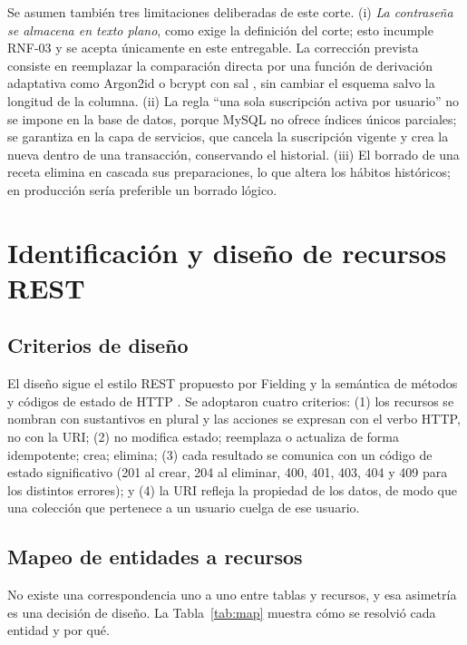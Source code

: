 Se asumen también tres limitaciones deliberadas de este corte. (i) \emph{La contraseña se almacena en texto plano}, como exige la definición del corte; esto incumple RNF-03 y se acepta únicamente en este entregable. La corrección prevista consiste en reemplazar la comparación directa por una función de derivación adaptativa como Argon2id o bcrypt con sal \cite{owasp,nist}, sin cambiar el esquema salvo la longitud de la columna. (ii) La regla ``una sola suscripción activa por usuario'' no se impone en la base de datos, porque MySQL no ofrece índices únicos parciales; se garantiza en la capa de servicios, que cancela la suscripción vigente y crea la nueva dentro de una transacción, conservando el historial. (iii) El borrado de una receta elimina en cascada sus preparaciones, lo que altera los hábitos históricos; en producción sería preferible un borrado lógico.

\section{Identificación y diseño de recursos REST}

\subsection{Criterios de diseño}
El diseño sigue el estilo REST propuesto por Fielding \cite{fielding} y la semántica de métodos y códigos de estado de HTTP \cite{rfc9110}. Se adoptaron cuatro criterios: (1) los recursos se nombran con sustantivos en plural y las acciones se expresan con el verbo HTTP, no con la URI; (2)  no modifica estado;  reemplaza o actualiza de forma idempotente;  crea;  elimina; (3) cada resultado se comunica con un código de estado significativo (201 al crear, 204 al eliminar, 400, 401, 403, 404 y 409 para los distintos errores); y (4) la URI refleja la propiedad de los datos, de modo que una colección que pertenece a un usuario cuelga de ese usuario.

\subsection{Mapeo de entidades a recursos}
No existe una correspondencia uno a uno entre tablas y recursos, y esa asimetría es una decisión de diseño. La Tabla~\ref{tab:map} muestra cómo se resolvió cada entidad y por qué.


